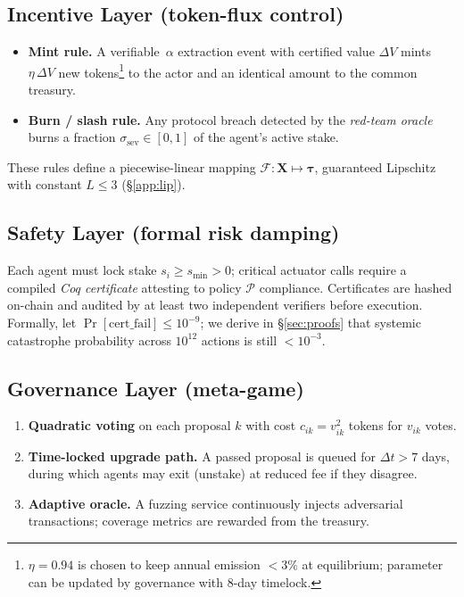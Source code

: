 \documentclass[11pt]{article}
\theoremstyle{plain}
\begin{document}
\subsection{Incentive Layer (token-flux control)}
\begin{itemize}\itemsep2pt
\item \textbf{Mint rule.}  
A verifiable~$\alpha$ extraction event with certified value 
$\Delta V$ mints $\eta\,\Delta V$ new tokens\footnote{%
$\eta=0.94$ is chosen to keep annual emission $<3\%$ at equilibrium;
parameter can be updated by governance with 8-day timelock.} 
to the actor and an identical amount to the common treasury.
\item \textbf{Burn / slash rule.}  
Any protocol breach detected by the \emph{red-team oracle} burns a
fraction $\sigma_{\text{sev}}\!\in\![0,1]$ of the agent’s active stake.
\end{itemize}
These rules define a piecewise-linear mapping
$\mathcal{F}:\bm{X}\!\mapsto\!\bm{\tau}$,  
guaranteed Lipschitz with constant $L\le 3$ (\S\ref{app:lip}).

\subsection{Safety Layer (formal risk damping)}
Each agent must lock stake $s_i\!\ge\!s_{\min}>0$;  
critical actuator calls require a compiled \emph{Coq certificate}
attesting to policy $\mathcal{P}$ compliance.  
Certificates are hashed on-chain and audited by at least two
independent verifiers before execution.  
Formally, let 
$\Pr[\text{cert\_fail}]\le 10^{-9}$;  
we derive in \S\ref{sec:proofs} that systemic catastrophe probability
across $10^{12}$ actions is still $<10^{-3}$.

\subsection{Governance Layer (meta-game)}
\begin{enumerate}\itemsep2pt
\item \textbf{Quadratic voting} on each proposal $k$ with cost
$c_{ik}=v_{ik}^2$ tokens for $v_{ik}$ votes.  
\item \textbf{Time-locked upgrade path.}  
A passed proposal is queued for $\Delta t\!>\!7$ days, during which
agents may exit (unstake) at reduced fee if they disagree.
\item \textbf{Adaptive oracle.}  
A fuzzing service continuously injects adversarial transactions;
coverage metrics are rewarded from the treasury.
\end{enumerate}
\end{document}
